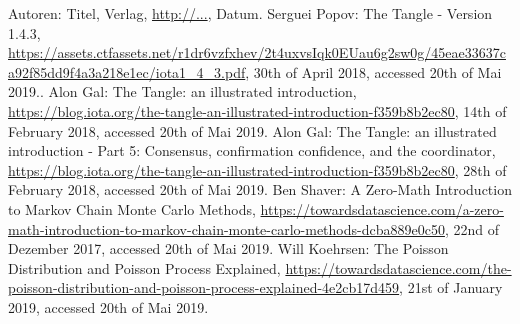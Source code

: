 \begin{thebibliography}{99}

 Autoren: Titel, Verlag, \url{http://...}, Datum.
 Serguei Popov: The Tangle - Version 1.4.3, \url{https://assets.ctfassets.net/r1dr6vzfxhev/2t4uxvsIqk0EUau6g2sw0g/45eae33637ca92f85dd9f4a3a218e1ec/iota1_4_3.pdf}, 30th of April 2018, accessed 20th of Mai 2019..
 Alon Gal: The Tangle: an illustrated introduction, \url{https://blog.iota.org/the-tangle-an-illustrated-introduction-f359b8b2ec80}, 14th of February 2018, accessed 20th of Mai 2019.
 Alon Gal: The Tangle: an illustrated introduction - Part 5: Consensus, confirmation confidence, and the coordinator, \url{https://blog.iota.org/the-tangle-an-illustrated-introduction-f359b8b2ec80}, 28th of February 2018, accessed 20th of Mai 2019.
 Ben Shaver: A Zero-Math Introduction to Markov Chain Monte Carlo Methods, \url{https://towardsdatascience.com/a-zero-math-introduction-to-markov-chain-monte-carlo-methods-dcba889e0c50}, 22nd of Dezember 2017, accessed 20th of Mai 2019.
 Will Koehrsen: The Poisson Distribution and Poisson Process Explained, \url{https://towardsdatascience.com/the-poisson-distribution-and-poisson-process-explained-4e2cb17d459}, 21st of January 2019, accessed 20th of Mai 2019.


\end{thebibliography}

